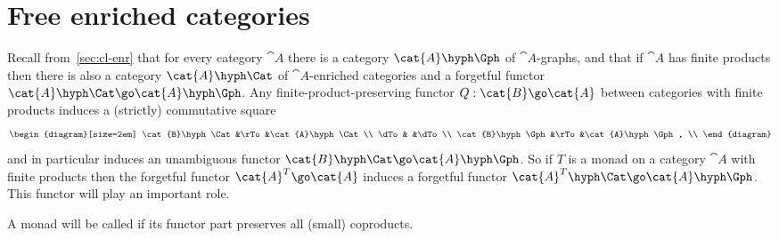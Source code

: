 \section{Free enriched categories}
%
%
%
%
%

Recall from~\ref{sec:cl-enr} that for every category $\cat{A}$ there is a
category $\cat{A}\hyph\Gph$ of $\cat{A}$-graphs, and that if $\cat{A}$ has
finite products then there is also a category $\cat{A}\hyph\Cat$ of
$\cat{A}$-enriched categories and a forgetful functor $\cat{A}\hyph\Cat \go
\cat{A}\hyph\Gph$.  Any finite-product-preserving functor $Q: \cat{B} \go
\cat{A}$ between categories with finite products induces a (strictly)
commutative square
%
\[
\begin{diagram}[size=2em]
\cat{B}\hyph\Cat	&\rTo	&\cat{A}\hyph\Cat	\\
\dTo			&	&\dTo			\\
\cat{B}\hyph\Gph	&\rTo	&\cat{A}\hyph\Gph,	\\
\end{diagram}
\]
and in particular induces an unambiguous functor $\cat{B}\hyph\Cat \go
\cat{A}\hyph\Gph$.  So if $T$ is a monad on a category $\cat{A}$ with
finite products then the forgetful functor $\cat{A}^T \go \cat{A}$ induces
a forgetful functor $\cat{A}^T\hyph\Cat \go \cat{A}\hyph\Gph$.  This
functor will play an important role.

A monad will be called %
%
%
%
%
%
if its functor part
preserves all (small) coproducts.

